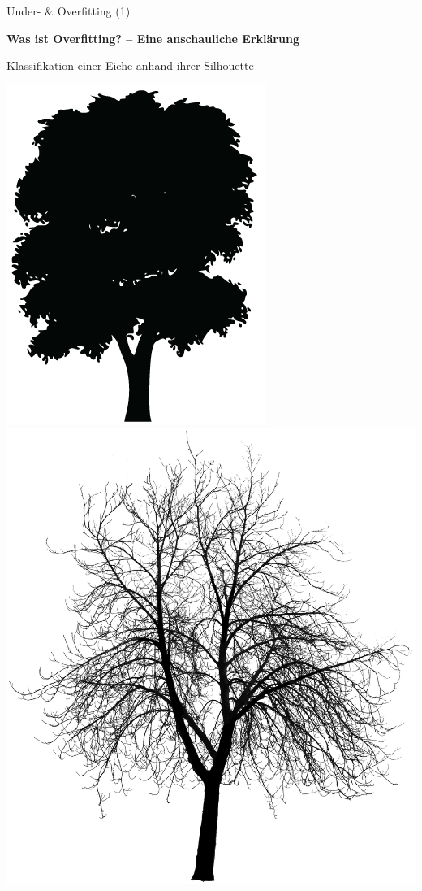 \begin{frame}{Under- \& Overfitting (1)}

\textbf{Was ist Overfitting? -- Eine anschauliche Erklärung}

Klassifikation einer Eiche anhand ihrer Silhouette

\begin{center}
\includegraphics[height=0.9\textheight]{src/baumsilhouette} \pause
\includegraphics[height=0.9\textheight]{src/baumsilhouettewinter}
\end{center}


\end{frame}


